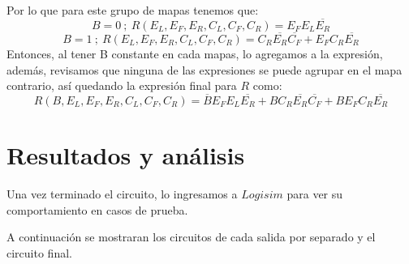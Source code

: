 \documentclass[a4paper]{article}
\begin{document}
Por lo que para este grupo de mapas tenemos que:
\begin{equation}
    B = 0\ ;\  R(E_L,E_F,E_R,C_L,C_F,C_R) = E_F E_L \overline{E_R}
\end{equation}
\begin{equation}
    B = 1\ ;\  R(E_L,E_F,E_R,C_L,C_F,C_R) =  C_R \overline{E_R} \overline{C_F} + E_F C_R \overline{E_R}
\end{equation}
Entonces, al tener B constante en cada mapas, lo agregamos a la expresión, además, revisamos que ninguna de las expresiones se puede agrupar en el mapa contrario, así quedando la expresión final para $R$ como:
\begin{equation}
    R(B,E_L,E_F,E_R,C_L,C_F,C_R) = \overline{B} E_F E_L \overline{E_R} + B C_R \overline{E_R} \overline{C_F} + B E_F C_R \overline{E_R}
\end{equation}
\newpage
\section{Resultados y análisis}

Una vez terminado el circuito, lo ingresamos a $Logisim$ para ver su comportamiento en casos de prueba.

A continuación se mostraran los circuitos de cada salida por separado y el circuito final.
\end{document}
